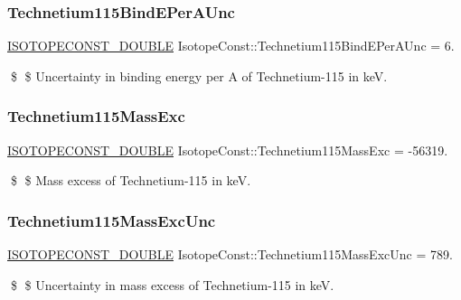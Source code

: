 \subsubsection{\texorpdfstring{Technetium115\+Bind\+E\+Per\+A\+Unc}{Technetium115BindEPerAUnc}}
{\footnotesize\ttfamily \mbox{\hyperlink{group___isotope_const-_macros_ga8f45a7272ce02c0b4c65c44636ed719a}{I\+S\+O\+T\+O\+P\+E\+C\+O\+N\+S\+T\+\_\+\+D\+O\+U\+B\+LE}} Isotope\+Const\+::\+Technetium115\+Bind\+E\+Per\+A\+Unc = 6.}

\$ \$ Uncertainty in binding energy per A of Technetium-\/115 in keV. \mbox{\label{group___isotope_const-_technetium-_tc115_gaebed5f7ec71d2ce1df4b9e2437b5f351}} 
\subsubsection{\texorpdfstring{Technetium115\+Mass\+Exc}{Technetium115MassExc}}
{\footnotesize\ttfamily \mbox{\hyperlink{group___isotope_const-_macros_ga8f45a7272ce02c0b4c65c44636ed719a}{I\+S\+O\+T\+O\+P\+E\+C\+O\+N\+S\+T\+\_\+\+D\+O\+U\+B\+LE}} Isotope\+Const\+::\+Technetium115\+Mass\+Exc = -\/56319.}

\$ \$ Mass excess of Technetium-\/115 in keV. \mbox{\label{group___isotope_const-_technetium-_tc115_gaed3bbd10f777a5ab6a79693607b36a68}} 
\subsubsection{\texorpdfstring{Technetium115\+Mass\+Exc\+Unc}{Technetium115MassExcUnc}}
{\footnotesize\ttfamily \mbox{\hyperlink{group___isotope_const-_macros_ga8f45a7272ce02c0b4c65c44636ed719a}{I\+S\+O\+T\+O\+P\+E\+C\+O\+N\+S\+T\+\_\+\+D\+O\+U\+B\+LE}} Isotope\+Const\+::\+Technetium115\+Mass\+Exc\+Unc = 789.}

\$ \$ Uncertainty in mass excess of Technetium-\/115 in keV. \mbox{\label{group___isotope_const-_technetium-_tc115_ga88d6494344fab3497b622109687c275a}} 
